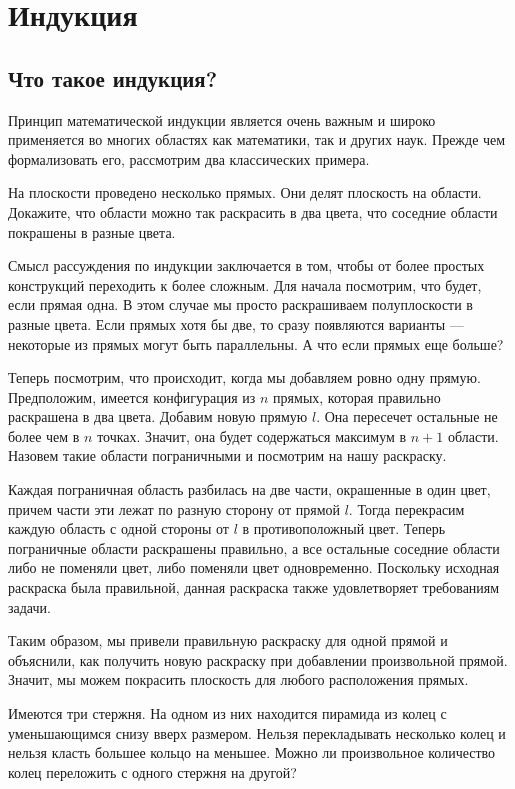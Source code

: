 \section{Индукция}
\subsection{Что такое индукция?}
Принцип математической индукции является очень важным и широко
применяется во многих областях как математики, так и других наук.
Прежде чем формализовать его, рассмотрим два классических примера.

\begin{task}
    На плоскости проведено несколько прямых. Они делят плоскость
    на области. Докажите, что области можно так раскрасить в два
    цвета, что соседние области покрашены в разные цвета.
\end{task}
Смысл рассуждения по индукции заключается в том, чтобы от более
простых конструкций переходить к более сложным. Для начала посмотрим,
что будет, если прямая одна. В этом случае мы просто раскрашиваем
полуплоскости в разные цвета. Если прямых хотя бы две, то сразу
появляются варианты --- некоторые из прямых могут быть параллельны.
А что если прямых еще больше? 

Теперь посмотрим, что происходит, когда мы добавляем ровно одну
прямую. Предположим, имеется конфигурация из $n$ прямых, которая
правильно раскрашена в два цвета. Добавим новую прямую $l$. Она
пересечет остальные не более чем в $n$ точках. Значит, она будет
содержаться максимум в $n+1$ области. Назовем такие области
пограничными и посмотрим на нашу раскраску.

Каждая пограничная область разбилась на две части, окрашенные в один
цвет, причем части эти лежат по разную сторону от прямой $l$. Тогда
перекрасим каждую область с одной стороны от $l$ в противоположный
цвет. Теперь пограничные области раскрашены правильно, а все
остальные соседние области либо не поменяли цвет, либо поменяли цвет
одновременно. Поскольку исходная раскраска была правильной, данная
раскраска также удовлетворяет требованиям задачи.

Таким образом, мы привели правильную раскраску для одной прямой и
объяснили, как получить новую раскраску при добавлении произвольной
прямой. Значит, мы можем покрасить плоскость для любого расположения
прямых.

\begin{task}
    Имеются три стержня. На одном из них находится пирамида из колец
    с уменьшающимся снизу вверх размером. Нельзя перекладывать
    несколько колец и нельзя класть большее кольцо на меньшее.
    Можно ли произвольное количество колец переложить с одного стержня
    на другой?
\end{task}

